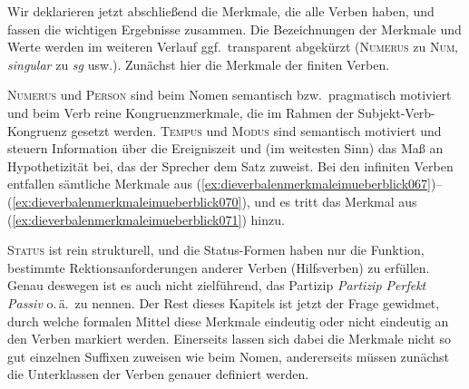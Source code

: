 Wir deklarieren jetzt abschließend die Merkmale, die alle Verben haben, und fassen die wichtigen Ergebnisse zusammen.
Die Bezeichnungen der Merkmale und Werte werden im weiteren Verlauf ggf.\ transparent abgekürzt (\textsc{Numerus} zu \textsc{Num}, \textit{singular} zu \textit{sg} usw.).
Zunächst hier die Merkmale der finiten Verben.%

\begin{exe}
\end{exe}

\textsc{Numerus} und \textsc{Person} sind beim Nomen semantisch bzw.\ pragmatisch motiviert und beim Verb reine Kongruenzmerkmale, die im Rahmen der Subjekt-Verb-Kongruenz gesetzt werden.
\textsc{Tempus} und \textsc{Modus} sind semantisch motiviert und steuern Information über die Ereigniszeit und (im weitesten Sinn) das Maß an Hypothetizität bei, das der Sprecher dem Satz zuweist.
Bei den infiniten Verben entfallen sämtliche Merkmale aus (\ref{ex:dieverbalenmerkmaleimueberblick067})--(\ref{ex:dieverbalenmerkmaleimueberblick070}), und es tritt das Merkmal aus (\ref{ex:dieverbalenmerkmaleimueberblick071}) hinzu.

\begin{exe}
\end{exe}

\textsc{Status} ist rein strukturell, und die Status-Formen haben nur die Funktion, bestimmte Rektionsanforderungen anderer Verben (\zB Hilfsverben) zu erfüllen.
Genau deswegen ist es auch nicht zielführend, das Partizip \textit{Partizip Perfekt Passiv} o.\,ä.\ zu nennen.
Der Rest dieses Kapitels ist jetzt der Frage gewidmet, durch welche formalen Mittel diese Merkmale eindeutig oder nicht eindeutig an den Verben markiert werden.
Einerseits lassen sich dabei die Merkmale nicht so gut einzelnen Suffixen zuweisen wie beim Nomen, andererseits müssen zunächst die Unterklassen der Verben genauer definiert werden.


